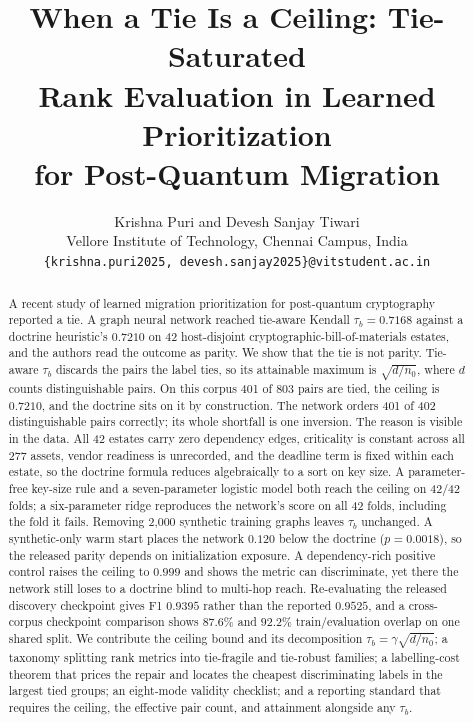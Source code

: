 \documentclass[journal,10pt]{IEEEtran}
\newcommand{\tb}{\tau_b}
\newcommand{\distinct}{d}
\newcommand{\nzero}{n_0}
\begin{document}
\title{When a Tie Is a Ceiling: Tie-Saturated\\Rank Evaluation in Learned Prioritization\\for Post-Quantum Migration}

\author{Krishna Puri and Devesh Sanjay Tiwari\\
\small Vellore Institute of Technology, Chennai Campus, India\\
\small \texttt{\{krishna.puri2025, devesh.sanjay2025\}@vitstudent.ac.in}}


\maketitle

\begin{abstract}
A recent study of learned migration prioritization for post-quantum cryptography reported a tie.
A graph neural network reached tie-aware Kendall $\tb=0.7168$ against a doctrine heuristic's
$0.7210$ on 42 host-disjoint cryptographic-bill-of-materials estates, and the authors read the
outcome as parity. We show that the tie is not parity. Tie-aware $\tb$ discards the pairs the
label ties, so its attainable maximum is $\sqrt{\distinct/\nzero}$, where $\distinct$ counts
distinguishable pairs. On this corpus 401 of 803 pairs are tied, the ceiling is $0.7210$, and the
doctrine sits on it by construction. The network orders 401 of 402 distinguishable pairs
correctly; its whole shortfall is one inversion. The reason is visible in the data. All 42 estates
carry zero dependency edges, criticality is constant across all 277 assets, vendor readiness is
unrecorded, and the deadline term is fixed within each estate, so the doctrine formula reduces
algebraically to a sort on key size. A parameter-free key-size rule and a seven-parameter logistic
model both reach the ceiling on 42/42 folds; a six-parameter ridge reproduces the network's score
on all 42 folds, including the fold it fails. Removing 2{,}000 synthetic training graphs leaves
$\tb$ unchanged. A synthetic-only warm start places the network $0.120$ below the doctrine
($p=0.0018$), so the released parity depends on initialization exposure. A dependency-rich
positive control raises the ceiling to $0.999$ and shows the metric can discriminate, yet there
the network still loses to a doctrine blind to multi-hop reach. Re-evaluating the released
discovery checkpoint gives F1 $0.9395$ rather than the reported $0.9525$, and a cross-corpus
checkpoint comparison shows $87.6\%$ and $92.2\%$ train/evaluation overlap on one shared split. We
contribute the ceiling bound and its decomposition $\tb=\gamma\sqrt{\distinct/\nzero}$; a taxonomy
splitting rank metrics into tie-fragile and tie-robust families; a labelling-cost theorem that
prices the repair and locates the cheapest discriminating labels in the largest tied groups; an
eight-mode validity checklist; and a reporting standard that requires the ceiling, the effective
pair count, and attainment alongside any $\tb$.
\end{abstract}
\end{document}
